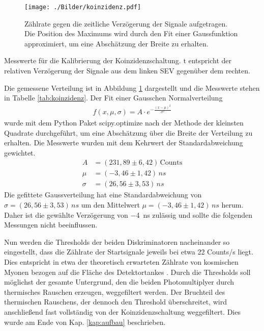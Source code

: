 \begin{figure}[htbp]
	\texttt{[image: ./Bilder/koinzidenz.pdf]}
	\caption{Zählrate gegen die zeitliche Verzögerung der Signale aufgetragen. Die Position des Maximums wird durch den Fit einer Gaussfunktion approximiert, um eine Abschätzung der Breite zu erhalten.}
	\label{fig:koinzidenz}
\end{figure}

\begin{table}[htbp]
	
	\caption{Messwerte für die Kalibrierung der Koinzidenzschaltung. t entspricht der relativen Verzögerung der Signale aus dem linken SEV gegenüber dem rechten.}
	\label{tab:koinzidenz}
\end{table}

Die gemessene Verteilung ist in Abbildung \ref{fig:koinzidenz} dargestellt und die Messwerte stehen in Tabelle \ref{tab:koinzidenz}. Der Fit einer Gausschen Normalverteilung
\begin{align}
	f(x,\mu,\sigma) = A\cdot e^{-\frac{(x-\mu)^2}{\sigma^2}}
\end{align}
wurde mit dem Python Paket scipy.optimize nach der Methode der kleinsten Quadrate durchgeführt, um eine Abschätzung über die Breite der Verteilung zu erhalten. Die Messwerte wurden mit dem Kehrwert der Standardabweichung gewichtet.
\begin{align}
A &= (231,89 \pm 6,42)\,\text{Counts}\\
\mu &= (-3,46 \pm 1,42)\,\si{ns}\\
\sigma &= ({26,56} \pm 3,53)\,\si{ns}
\end{align}
Die gefittete Gaussverteilung hat eine Standardabweichung von $\sigma = ({26,56} \pm 3,53)\,\si{ns}$ um den Mittelwert $\mu = (-3,46 \pm 1,42)\,\si{ns}$ herum. Daher ist die gewählte Verzögerung von \SI{-4}{ns} zulässig und sollte die folgenden Messungen nicht beeinflussen.

Nun werden die Thresholds der beiden Diskriminatoren nacheinander so eingestellt, dass die Zählrate der Startsignale jeweils bei etwa 22 Counts/s liegt. Dies entspricht in etwa der theoretisch erwarteten Zählrate von kosmischen Myonen bezogen auf die Fläche des Detektortankes \cite{Anl}. Durch die Thresholds soll möglichst der gesamte Untergrund, den die beiden Photomultiplyer durch thermisches Rauschen erzeugen, weggefiltert werden. Der Bruchteil des thermischen Rauschens, der dennoch den Threshold überschreitet, wird anschließend fast vollständig von der Koinzidenzschaltung weggefiltert. Dies wurde am Ende von Kap. \ref{kap:aufbau} beschrieben.

